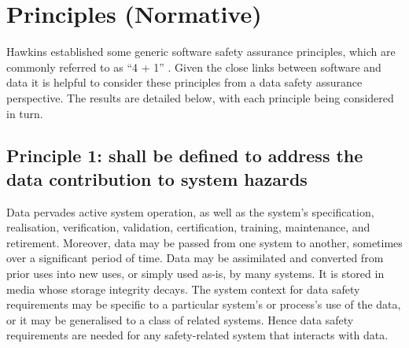 %
%
\chapter{Principles (Normative)} \label{bkm:principlesprocess}


Hawkins  established some generic software safety assurance principles, which are commonly referred to as ``4 + 1'' \cite{citation:hawkins2013principles}. Given the close links between software and data it is helpful to consider these principles from a data safety assurance perspective. The results are detailed below, with each principle being considered in turn.

\section{Principle 1:  shall be defined to address the data contribution to system hazards}
Data pervades active system operation, as well as the system's specification, realisation, \gls{verification}, \gls{validation}, certification,  training, maintenance, and retirement. Moreover, data may be passed from one system to another, sometimes over a significant period of time. Data may be assimilated and converted from prior uses into new uses, or simply used as-is, by many systems. It is stored in media whose storage \gls{integrity} decays. The system context for \glspl{data safety requirement} may be specific to a particular system's or process's use of the data, or it may be generalised to a class of related systems. Hence \glspl{data safety requirement} are needed for any safety-related system that interacts with data.

